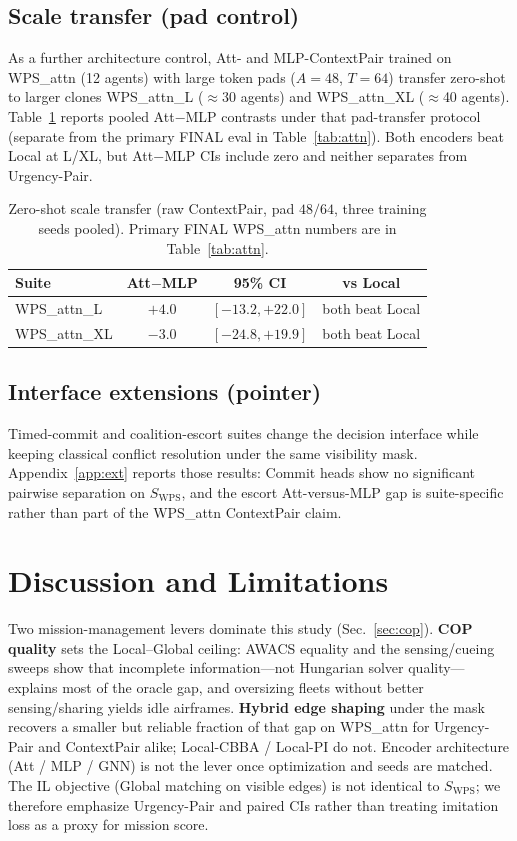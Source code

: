 \documentclass[journal,twocolumn,10pt]{IEEEtran}
\begin{document}
\subsection{Scale transfer (pad control)}
As a further architecture control, Att- and MLP-ContextPair trained on WPS\_attn (12 agents) with large token pads (\(A{=}48\), \(T{=}64\)) transfer zero-shot to larger clones WPS\_attn\_L ($\approx$30 agents) and WPS\_attn\_XL ($\approx$40 agents).
Table~\ref{tab:scale} reports pooled Att$-$MLP contrasts under that pad-transfer protocol (separate from the primary FINAL eval in Table~\ref{tab:attn}).
Both encoders beat Local at L/XL, but Att$-$MLP CIs include zero and neither separates from Urgency-Pair.

\begin{table}[t]
\centering
\caption{Zero-shot scale transfer (raw ContextPair, pad \(48/64\), three training seeds pooled). Primary FINAL WPS\_attn numbers are in Table~\ref{tab:attn}.}
\label{tab:scale}
\setlength{\tabcolsep}{3pt}
\begin{tabular}{lccc}
\toprule
Suite & Att$-$MLP & 95\% CI & vs Local \\
\midrule
WPS\_attn\_L & $+4.0$ & $[-13.2,+22.0]$ & both beat Local \\
WPS\_attn\_XL & $-3.0$ & $[-24.8,+19.9]$ & both beat Local \\
\bottomrule
\end{tabular}
\end{table}

\subsection{Interface extensions (pointer)}
Timed-commit and coalition-escort suites change the decision interface while keeping classical conflict resolution under the same visibility mask.
Appendix~\ref{app:ext} reports those results: Commit heads show no significant pairwise separation on \(S_{\mathrm{WPS}}\), and the escort Att-versus-MLP gap is suite-specific rather than part of the WPS\_attn ContextPair claim.

\section{Discussion and Limitations}
Two mission-management levers dominate this study (Sec.~\ref{sec:cop}).
\textbf{COP quality} sets the Local--Global ceiling: AWACS equality and the sensing/cueing sweeps show that incomplete information---not Hungarian solver quality---explains most of the oracle gap, and oversizing fleets without better sensing/sharing yields idle airframes.
\textbf{Hybrid edge shaping} under the mask recovers a smaller but reliable fraction of that gap on WPS\_attn for Urgency-Pair and ContextPair alike; Local-CBBA / Local-PI do not.
Encoder architecture (Att / MLP / GNN) is not the lever once optimization and seeds are matched.
The IL objective (Global matching on visible edges) is not identical to \(S_{\mathrm{WPS}}\); we therefore emphasize Urgency-Pair and paired CIs rather than treating imitation loss as a proxy for mission score.
\end{document}

